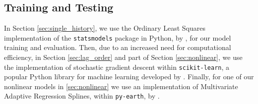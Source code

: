 \documentclass[master]{subfiles}
\begin{document}
\subsection{Training and Testing}
In Section \ref{sec:single_history}, we use the Ordinary Least Squares implementation of the \lstinline{statsmodels} package in Python, by \cite{statsmodels}, for our model training and evaluation.  Then, due to an increased need for computational efficiency, in Section \ref{sec:lag_order} and part of Section \ref{sec:nonlinear}, we use the implementation of stochastic gradient descent within \lstinline{scikit-learn}, a popular Python library for machine learning developed by \cite{scikit-learn}.  Finally, for one of our nonlinear models in \ref{sec:nonlinear} we use an implementation of Multivariate Adaptive Regression Splines, within \lstinline{py-earth}, by \cite{py-earth}.
\clearpage
\end{document}
